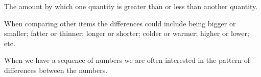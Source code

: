 The amount by which one quantity is greater than or less than another quantity.  

\par
When comparing other items the differences could include being  
bigger or smaller; fatter or thinner; longer or shorter; colder or
warmer; higher or lower; etc. \par
When we have a sequence of numbers we are often interested in the 
pattern of differences between the numbers.